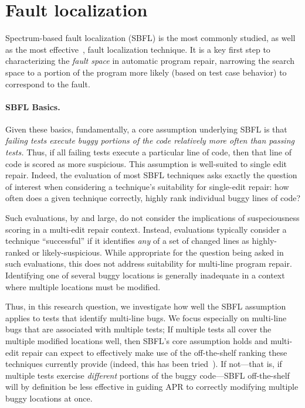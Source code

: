 \section{Fault localization}



Spectrum-based fault localization (SBFL) is the most commonly studied, as well as the most 
effective~\cite{zou2019empirical}, fault localization technique. It is a key
first step to characterizing the \emph{fault space} in automatic program repair,
narrowing the search space to a portion of the program more likely (based on
test case behavior) to correspond to the fault.  

\paragraph{SBFL Basics.} 

Given these basics, fundamentally, a core
assumption underlying SBFL is that \emph{failing tests execute buggy portions of 
the code relatively more often than passing tests.} Thus, if all failing tests execute a 
particular line of code, then that line of code is scored as more suspicious.
This assumption is well-suited to single edit repair. Indeed, the evaluation
of most SBFL techniques asks exactly the question of interest when considering a
technique's suitability for single-edit repair: how often does a given technique
correctly, highly rank individual buggy lines of code? 

Such evaluations, by and large, do not consider the implications of
suspeciousness scoring in a multi-edit repair context.  Instead, evaluations
typically consider a technique ``successful'' if it identifies \emph{any} of a
set of changed lines as highly-ranked or likely-suspicious.  While appropriate
for the question being asked in such evaluations, this does not address
suitability for multi-line program repair.  Identifying one of several buggy
locations is generally inadequate in a context where multiple locations must be
modified.  

Thus, in this research question, we investigate how well the SBFL assumption
applies to tests that identify multi-line bugs. We focus especially on
multi-line bugs that are associated with multiple tests;  If multiple tests all cover the multiple
modified locations well, then SBFL's core assumption holds and multi-edit repair
can expect to effectively make use of the off-the-shelf ranking these techniques
currently provide (indeed, this has been tried~\cite{angelix}). If not---that
is, if multiple tests exercise \emph{different} portions of the buggy
code---SBFL off-the-shelf will by definition be less effective in guiding APR to
correctly modifying multiple buggy locations at once.

